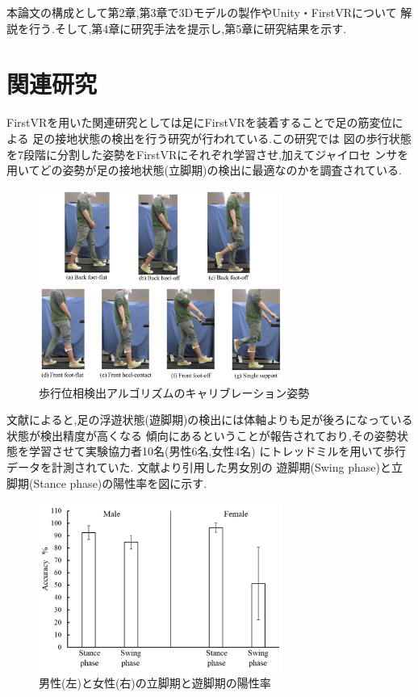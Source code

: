 \documentclass{ltjsreport}
\begin{document}
		本論文の構成として第2章,第3章で3Dモデルの製作やUnity・FirstVRについて
		解説を行う.そして,第4章に研究手法を提示し,第5章に研究結果を示す.

	\section{関連研究}
		FirstVRを用いた関連研究としては足にFirstVRを装着することで足の筋変位による
		足の接地状態の検出を行う研究\cite{ref:6}が行われている.この研究では
		図の歩行状態を7段階に分割した姿勢をFirstVRにそれぞれ学習させ,加えてジャイロセ
		ンサを用いてどの姿勢が足の接地状態(立脚期)の検出に最適なのかを調査されている.
		\begin{figure}[H]
		\centering
		\includegraphics[width = 8cm]{../figs/sensors-21-01081-g004.jpg}
		\hspace{-32truemm}
		\caption{歩行位相検出アルゴリズムのキャリブレーション姿勢}
		\label{fig:RR-FVRcalibration}
		\end{figure}

		文献\cite{ref:6}によると,足の浮遊状態(遊脚期)の検出には体軸よりも足が後ろになっている状態が検出精度が高くなる
		傾向にあるということが報告されており,その姿勢状態を学習させて実験協力者10名(男性6名,女性4名)
		にトレッドミルを用いて歩行データを計測されていた.
\clearpage
		文献\cite{ref:6}より引用した男女別の
		遊脚期(Swing phase)と立脚期(Stance phase)の陽性率を図に示す.

		\begin{figure}[H]
		\centering
		\includegraphics[width = 8cm]{../figs/sensors-21-01081-g010.jpg}
		\hspace{-32truemm}
		\caption{男性(左)と女性(右)の立脚期と遊脚期の陽性率\\}
		\label{fig:RR-malefemale}
		\end{figure}
\end{document}
